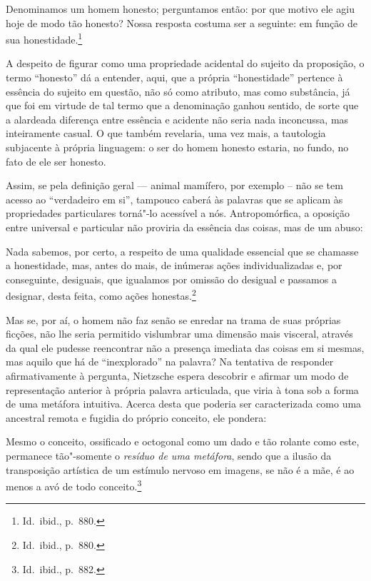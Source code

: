 \begin{hedraquote}
Denominamos um homem honesto; perguntamos então: 
por que motivo ele agiu hoje de modo tão
honesto? Nossa resposta costuma ser a seguinte: em função de sua
honestidade.\footnote{ Id.~ibid., p.~880.} 
\end{hedraquote}

A despeito de
figurar como uma propriedade acidental do sujeito da proposição, o
termo “honesto” dá a entender, aqui, que a própria “honestidade”
pertence à essência do sujeito em questão, não só como atributo, mas
como substância, já que foi em virtude de tal termo que a denominação
ganhou sentido, de sorte que a alardeada diferença entre essência e
acidente não seria nada inconcussa, mas inteiramente casual. O que
também revelaria, uma vez mais, a tautologia subjacente à própria
linguagem: o ser do homem honesto estaria, no fundo, no fato de ele ser
honesto.

Assim, se pela definição geral --- animal mamífero, por exemplo -- não se
tem acesso ao “verdadeiro em si”, tampouco caberá às palavras
que se aplicam às propriedades particulares torná"-lo acessível a nós.
Antropomórfica, a oposição entre universal e particular não proviria da
essência das coisas, mas de um abuso: 

\begin{hedraquote}
Nada sabemos, por
certo, a respeito de uma qualidade essencial que se chamasse a
honestidade, mas, antes do mais, de inúmeras ações individualizadas e,
por conseguinte, desiguais, que igualamos por omissão do desigual e
passamos a designar, desta feita, como ações
honestas.\footnote{ Id.~ibid., p.~880.}
\end{hedraquote}

Mas se, por aí, o homem não faz senão se enredar na trama de suas
próprias ficções, não lhe seria permitido vislumbrar uma dimensão mais
visceral, através da qual ele pudesse reencontrar não a presença
imediata das coisas em si mesmas, mas aquilo que há de “inexplorado” na
palavra? Na tentativa de responder afirmativamente à pergunta,
Nietzsche espera descobrir e afirmar um modo de representação anterior
à própria palavra articulada, que viria à tona sob a forma de uma
metáfora intuitiva. Acerca desta que poderia ser caracterizada como uma
ancestral remota e fugidia do próprio conceito, ele pondera: 

\begin{hedraquote}
Mesmo o
conceito, ossificado e octogonal como um dado e tão rolante como este,
permanece tão"-somente o \textit{resíduo de uma metáfora}, sendo que a
ilusão da transposição artística de um estímulo nervoso em imagens, se
não é a mãe, é ao menos a avó de todo conceito.\footnote{ Id.~ibid.,
p.~882. }
\end{hedraquote}

